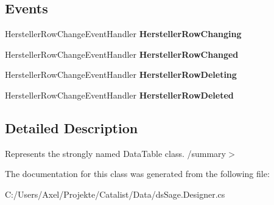 \subsection*{Events}
\begin{DoxyCompactItemize}
\item 
Hersteller\+Row\+Change\+Event\+Handler {\bfseries Hersteller\+Row\+Changing}\hypertarget{class_products_1_1_data_1_1ds_sage_1_1_hersteller_data_table_a752fa9675583e0d492a60c0912e206e0}{}\label{class_products_1_1_data_1_1ds_sage_1_1_hersteller_data_table_a752fa9675583e0d492a60c0912e206e0}

\item 
Hersteller\+Row\+Change\+Event\+Handler {\bfseries Hersteller\+Row\+Changed}\hypertarget{class_products_1_1_data_1_1ds_sage_1_1_hersteller_data_table_adbbc2e60b85d297fd5ef0363b722826b}{}\label{class_products_1_1_data_1_1ds_sage_1_1_hersteller_data_table_adbbc2e60b85d297fd5ef0363b722826b}

\item 
Hersteller\+Row\+Change\+Event\+Handler {\bfseries Hersteller\+Row\+Deleting}\hypertarget{class_products_1_1_data_1_1ds_sage_1_1_hersteller_data_table_a2670ecbbae134c13d91d6653ee87f79e}{}\label{class_products_1_1_data_1_1ds_sage_1_1_hersteller_data_table_a2670ecbbae134c13d91d6653ee87f79e}

\item 
Hersteller\+Row\+Change\+Event\+Handler {\bfseries Hersteller\+Row\+Deleted}\hypertarget{class_products_1_1_data_1_1ds_sage_1_1_hersteller_data_table_a4881932df1586b3f159e6cc35a17c9ce}{}\label{class_products_1_1_data_1_1ds_sage_1_1_hersteller_data_table_a4881932df1586b3f159e6cc35a17c9ce}

\end{DoxyCompactItemize}


\subsection{Detailed Description}
Represents the strongly named Data\+Table class. /summary$>$ 

The documentation for this class was generated from the following file\+:\begin{DoxyCompactItemize}
\item 
C\+:/\+Users/\+Axel/\+Projekte/\+Catalist/\+Data/ds\+Sage.\+Designer.\+cs\end{DoxyCompactItemize}
